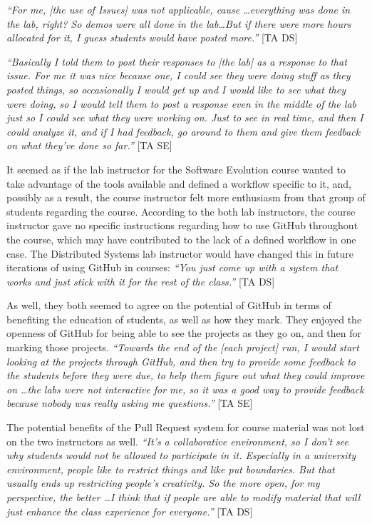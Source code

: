 \textit{``For me, [the use of Issues] was not applicable, cause \ldots everything was done in the lab, right? So demos were all done in the lab\ldots But if there were more hours allocated for it, I guess students would have posted more.''} [TA DS]

\textit{``Basically I told them to post their responses to [the lab] as a response to that issue. For me it was nice because one, I could see they were doing stuff as they posted things, so occasionally I would get up and I would like to see what they were doing, so I would tell them to post a response even in the middle of the lab just so I could see what they were working on. Just to see in real time, and then I could analyze it, and if I had feedback, go around to them and give them feedback on what they've done so far.''} [TA SE]

It seemed as if the lab instructor for the Software Evolution course wanted to take advantage of the tools available and defined a workflow specific to it, and, possibly as a result, the course instructor felt more enthusiasm from that group of students regarding the course. According to the both lab instructors, the course instructor gave no specific instructions regarding how to use GitHub throughout the course, which may have contributed to the lack of a defined workflow in one case. The Distributed Systems lab instructor would have changed this in future iterations of using GitHub in courses: \textit{``You just come up with a system that works and just stick with it for the rest of the class.''} [TA DS]

As well, they both seemed to agree on the potential of GitHub in terms of benefiting the education of students, as well as how they mark. They enjoyed the openness of GitHub for being able to see the projects as they go on, and then for marking those projects. \textit{``Towards the end of the [each project] run, I would start looking at the projects through GitHub, and then try to provide some feedback to the students before they were due, to help them figure out what they could improve on \ldots the labs were not interactive for me, so it was a good way to provide feedback because nobody was really asking me questions.''} [TA SE]

The potential benefits of the Pull Request system for course material was not lost on the two instructors as well. \textit{``It's a collaborative environment, so I don't see why students would not be allowed to participate in it. Especially in a university environment, people like to restrict things and like put boundaries. But that usually ends up restricting people's creativity. So the more open, for my perspective, the better \ldots I think that if people are able to modify material that will just enhance the class experience for everyone.''} [TA DS]

